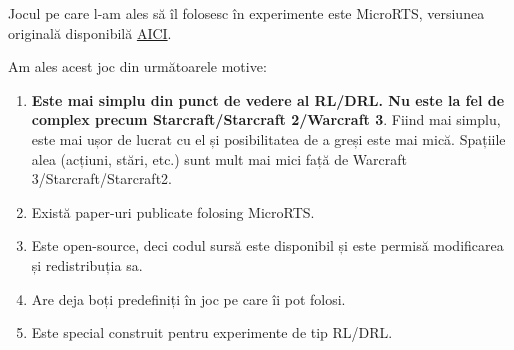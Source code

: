 \documentclass{article}
\begin{document}
Jocul pe care l-am ales să îl folosesc în experimente este MicroRTS, versiunea originală disponibilă \href{https://github.com/Farama-Foundation/MicroRTS}{AICI}.

Am ales acest joc din următoarele motive:
\begin{enumerate}
\item \textbf{Este mai simplu din punct de vedere al RL/DRL. Nu este la fel de complex precum Starcraft/Starcraft 2/Warcraft 3}. Fiind mai simplu, este mai ușor de lucrat cu el și posibilitatea de a greși este mai mică. Spațiile alea (acțiuni, stări, etc.) sunt mult mai mici față de Warcraft 3/Starcraft/Starcraft2.
\item Există paper-uri publicate folosing MicroRTS.
\item Este open-source, deci codul sursă este disponibil și este permisă modificarea și redistribuția sa.
\item Are deja boți predefiniți în joc pe care îi pot folosi.
\item Este special construit pentru experimente de tip RL/DRL.
\end{enumerate}


\end{document}
